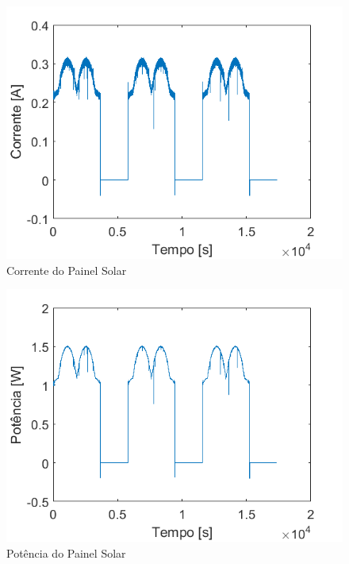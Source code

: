 \begin{figure}[!htpb]
\begin{center}
\includegraphics[scale=0.5]{figures/simulatedSolarPanelCurrent.png}
\caption{Corrente do Painel Solar}
\label{figura_simulacao_corrente_painel_solar}
\end{center}
\end{figure}

\begin{figure}[!htpb]
\begin{center}
\includegraphics[scale=0.5]{figures/simulatedSolarPanelPower.png}
\caption{Potência do Painel Solar}
\label{figura_simulacao_potencia_painel_solar}
\end{center}
\end{figure}

